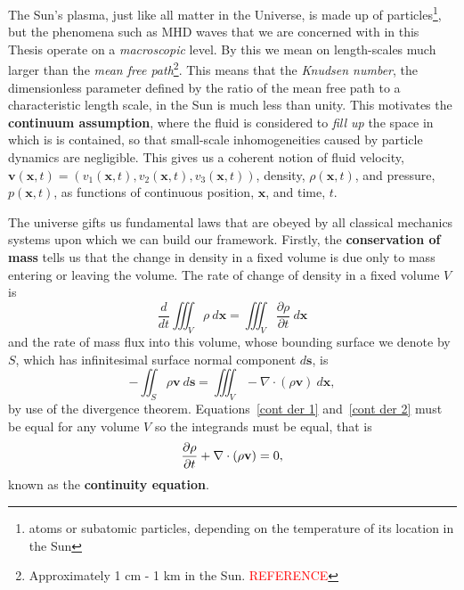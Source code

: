 \documentclass[12pt]{../style-files/ociamthesis}
\begin{document}
The Sun's plasma, just like all matter in the Universe, is made up of particles\footnote{atoms or subatomic particles, depending on the temperature of its location in the Sun}, but the phenomena such as MHD waves that we are concerned with in this Thesis operate on a \textit{macroscopic} level. By this we mean on length-scales much larger than the \textit{mean free path}\footnote{Approximately 1 cm - 1 km in the Sun. \textcolor{red}{REFERENCE}}. This means that the \textit{Knudsen number}, the dimensionless parameter defined by the ratio of the mean free path to a characteristic length scale, in the Sun is much less than unity. This motivates the \textbf{continuum assumption}, where the fluid is considered to \textit{fill up} the space in which is is contained, so that small-scale inhomogeneities caused by particle dynamics are negligible. This gives us a coherent notion of fluid velocity, $\mathbf{v}(\mathbf{x}, t) = (v_1(\mathbf{x}, t), v_2(\mathbf{x}, t), v_3(\mathbf{x}, t))$, density, $\rho(\mathbf{x}, t)$, and pressure, $p(\mathbf{x}, t)$, as functions of continuous position, $\mathbf{x}$, and time, $t$.

The universe gifts us fundamental laws that are obeyed by all classical mechanics systems upon which we can build our framework. Firstly, the \textbf{conservation of mass} tells us that the change in density in a fixed volume is due only to mass entering or leaving the volume. The rate of change of density in a fixed volume $V$ is
\begin{equation}
	\frac{d}{dt} \iiint_V \rho ~d\mathbf{x} = \iiint_V \frac{\partial\rho}{\partial t} ~d\mathbf{x} \label{cont der 1}
\end{equation}
and the rate of mass flux into this volume, whose bounding surface we denote by $S$, which has infinitesimal surface normal component $d\mathbf{s}$, is
\begin{equation}
	-\iint_S \rho \mathbf{v} ~d\mathbf{s} = \iiint_V -\nabla\cdot(\rho\mathbf{v}) ~d\mathbf{x}, \label{cont der 2}
\end{equation}
by use of the divergence theorem. Equations~\eqref{cont der 1} and~\eqref{cont der 2} must be equal for any volume $V$ so the integrands must be equal, that is
\begin{equation}
	\frac{\partial\rho}{\partial t} + \nabla\cdot(\rho \mathbf{v}) = 0, \label{cont eqn}
\end{equation}
known as the \textbf{continuity equation}.
\end{document}
